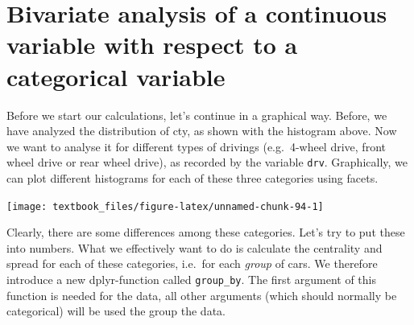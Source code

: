\documentclass[]{tufte-book}
\newenvironment{Shaded}{}{}
\newcommand{\DataTypeTok}[1]{\textcolor[rgb]{0.56,0.13,0.00}{#1}}
\newcommand{\DecValTok}[1]{\textcolor[rgb]{0.25,0.63,0.44}{#1}}
\newcommand{\FloatTok}[1]{\textcolor[rgb]{0.25,0.63,0.44}{#1}}
\newcommand{\KeywordTok}[1]{\textcolor[rgb]{0.00,0.44,0.13}{\textbf{#1}}}
\newcommand{\NormalTok}[1]{#1}
\newcommand{\OperatorTok}[1]{\textcolor[rgb]{0.40,0.40,0.40}{#1}}
\newcommand{\StringTok}[1]{\textcolor[rgb]{0.25,0.44,0.63}{#1}}
\begin{document}
\hypertarget{bivariate-analysis-of-a-continuous-variable-with-respect-to-a-categorical-variable}{%
\section{Bivariate analysis of a continuous variable with respect to a categorical variable}\label{bivariate-analysis-of-a-continuous-variable-with-respect-to-a-categorical-variable}}

Before we start our calculations, let's continue in a graphical way. Before, we have analyzed the distribution of cty, as shown with the histogram above. Now we want to analyse it for different types of drivings (e.g.~4-wheel drive, front wheel drive or rear wheel drive), as recorded by the variable \texttt{drv}. Graphically, we can plot different histograms for each of these three categories using facets.

\begin{Shaded}
\end{Shaded}

\texttt{[image: textbook\_files/figure-latex/unnamed-chunk-94-1]}

Clearly, there are some differences among these categories. Let's try to put these into numbers. What we effectively want to do is calculate the centrality and spread for each of these categories, i.e.~for each \emph{group} of cars. We therefore introduce a new dplyr-function called \texttt{group\_by}. The first argument of this function is needed for the data, all other arguments (which should normally be categorical) will be used the group the data.
\end{document}
